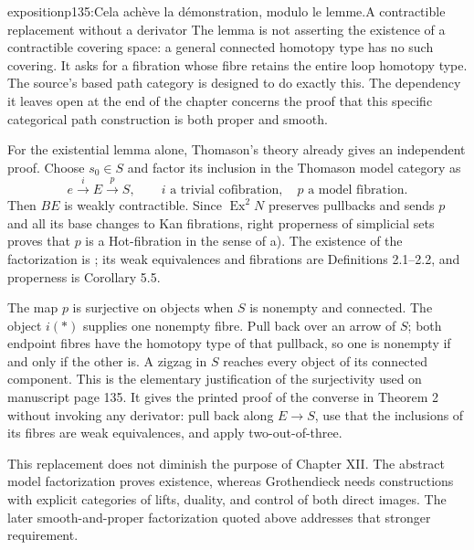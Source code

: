 \begin{dcomment}{exposition}{p135:Cela achève la démonstration, modulo le lemme.}{A contractible replacement without a derivator}
The lemma is not asserting the existence of a contractible covering space: a general connected homotopy type has no such covering. It asks for a fibration whose fibre retains the entire loop homotopy type. The source's based path category is designed to do exactly this. The dependency it leaves open at the end of the chapter concerns the proof that this specific categorical path construction is both proper and smooth.

For the existential lemma alone, Thomason's theory already gives an independent proof. Choose \(s_0\in S\) and factor its inclusion in the Thomason model category as
\[
 e\xrightarrow{\ i\ }E\xrightarrow{\ p\ }S,
 \qquad i\text{ a trivial cofibration},\quad
 p\text{ a model fibration}.
\]
Then \(BE\) is weakly contractible. Since \(\operatorname{Ex}^2N\) preserves pullbacks and sends \(p\) and all its base changes to Kan fibrations, right properness of simplicial sets proves that \(p\) is a Hot-fibration in the sense of a). The existence of the factorization is \citet[Theorem 4.9]{Thomason1980}; its weak equivalences and fibrations are Definitions 2.1--2.2, and properness is Corollary 5.5.

The map \(p\) is surjective on objects when \(S\) is nonempty and connected. The object \(i(*)\) supplies one nonempty fibre. Pull back over an arrow of \(S\); both endpoint fibres have the homotopy type of that pullback, so one is nonempty if and only if the other is. A zigzag in \(S\) reaches every object of its connected component. This is the elementary justification of the surjectivity used on manuscript page 135. It gives the printed proof of the converse in Theorem 2 without invoking any derivator: pull back along \(E\longrightarrow S\), use that the inclusions of its fibres are weak equivalences, and apply two-out-of-three.

This replacement does not diminish the purpose of Chapter XII. The abstract model factorization proves existence, whereas Grothendieck needs constructions with explicit categories of lifts, duality, and control of both direct images. The later smooth-and-proper factorization quoted above addresses that stronger requirement.
\end{dcomment}


